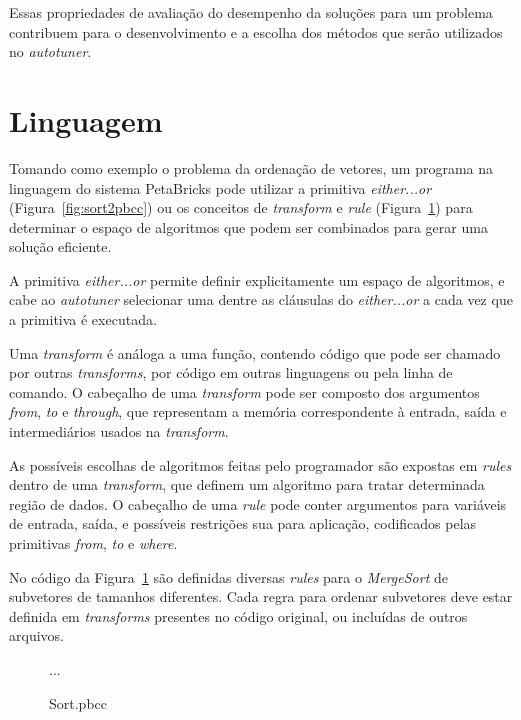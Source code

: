 \documentclass[a4paper, 11pt, twoside]{article}
\begin{document}
Essas propriedades de avaliação do desempenho da soluções para um problema 
contribuem para o desenvolvimento e a escolha dos métodos
que serão utilizados no \emph{autotuner}.

\section{Linguagem}

Tomando como exemplo o problema da ordenação de vetores, um programa na
linguagem do sistema PetaBricks pode utilizar a primitiva \emph{either...or} 
(Figura~\ref{fig:sort2pbcc}) ou os conceitos de \emph{transform} e \emph{rule}
(Figura~\ref{fig:sortpbcc}) para determinar o espaço de algoritmos que podem 
ser combinados para gerar uma solução eficiente.

A primitiva \emph{either...or} permite definir explicitamente um espaço
de algoritmos, e cabe ao \emph{autotuner} selecionar uma dentre as cláusulas
do \emph{either...or} a cada vez que a primitiva é executada.

Uma \emph{transform} é análoga a uma função, contendo código que pode
ser chamado por outras \emph{transforms}, por código em outras linguagens
ou pela linha de comando. O cabeçalho de uma \emph{transform} pode ser composto
dos argumentos \emph{from}, \emph{to} e \emph{through}, que representam a
memória correspondente à entrada, saída e intermediários usados na 
\emph{transform}.

As possíveis escolhas de algoritmos feitas pelo programador são expostas 
em \emph{rules} dentro de uma \emph{transform}, que definem um algoritmo
para tratar determinada região de dados. O cabeçalho de uma \emph{rule} pode
conter argumentos para variáveis de entrada, saída, e possíveis restrições sua 
para aplicação, codificados pelas primitivas \emph{from}, \emph{to} e 
\emph{where}.

No código da Figura~\ref{fig:sortpbcc} são definidas diversas \emph{rules}
para o \emph{MergeSort} de subvetores de tamanhos diferentes. Cada regra
para ordenar subvetores deve estar definida em \emph{transforms} presentes
no código original, ou incluídas de outros arquivos.

\begin{figure}[H]
    
    ...
    
    \centering
    \caption{Sort.pbcc}
    \label{fig:sortpbcc}
\end{figure}
\end{document}

